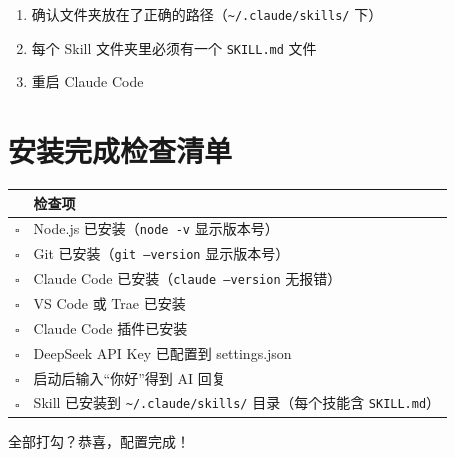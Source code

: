 \documentclass[12pt,a4paper]{ctexart}
\begin{document}
\begin{enumerate}[nosep]
    \item 确认文件夹放在了正确的路径（\texttt{\textasciitilde/.claude/skills/} 下）
    \item 每个 Skill 文件夹里必须有一个 \texttt{SKILL.md} 文件
    \item 重启 Claude Code
\end{enumerate}

\section{安装完成检查清单}

{
\centering
\begin{tabular}{>{\centering\arraybackslash}p{0.6cm}>{\RaggedRight\arraybackslash}p{13.9cm}}
\toprule
& \textbf{检查项} \\
\midrule
$\square$ & Node.js 已安装（\texttt{node -v} 显示版本号） \\
\midrule
$\square$ & Git 已安装（\texttt{git --version} 显示版本号） \\
\midrule
$\square$ & Claude Code 已安装（\texttt{claude --version} 无报错） \\
\midrule
$\square$ & VS Code 或 Trae 已安装 \\
\midrule
$\square$ & Claude Code 插件已安装 \\
\midrule
$\square$ & DeepSeek API Key 已配置到 settings.json \\
\midrule
$\square$ & 启动后输入``你好''得到 AI 回复 \\
\midrule
$\square$ & Skill 已安装到 \texttt{\textasciitilde/.claude/skills/} 目录（每个技能含 \texttt{SKILL.md}）\\
\bottomrule
\end{tabular}
\par}

\vspace{12pt}

全部打勾？恭喜，配置完成！
\end{document}
